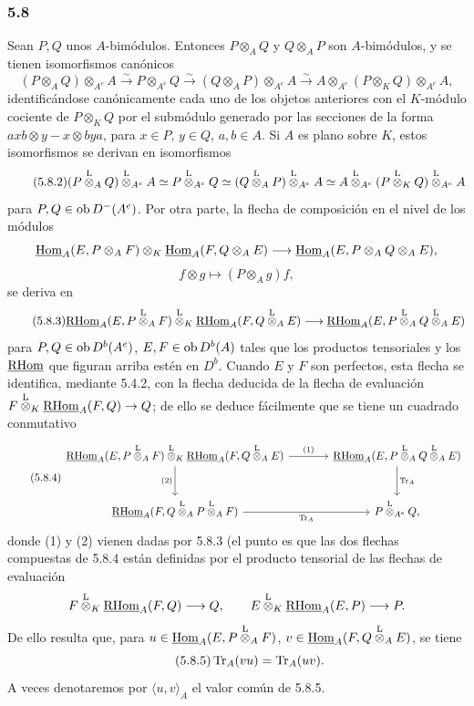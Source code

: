 \subsubsection*{5.8}

Sean $P,Q$ unos $A$-bimódulos. Entonces $P\otimes_AQ$ y $Q\otimes_AP$ son $A$-bimódulos, y se tienen isomorfismos canónicos
\begin{equation}\tag{5.8.1}
(P\otimes_AQ)\otimes_{A^e}A\xrightarrow{\sim}P\otimes_{A^e}Q\xrightarrow{\sim}(Q\otimes_AP)\otimes_{A^e}A\xrightarrow{\sim}A\otimes_{A^e}(P\otimes_KQ)\otimes_{A^e}A,
\end{equation}
identificándose canónicamente cada uno de los objetos anteriores con el $K$-módulo cociente de $P\otimes_KQ$ por el submódulo generado por las secciones de la forma $axb\otimes y-x\otimes bya$, para $x\in P$, $y\in Q$, $a,b\in A$. Si $A$ es plano sobre $K$, estos isomorfismos se derivan en isomorfismos
\begin{equation}\tag{5.8.2}
(P\overset{\mathrm L}{\otimes}_AQ)\overset{\mathrm L}{\otimes}_{A^e}A\simeq P\overset{\mathrm L}{\otimes}_{A^e}Q\simeq(Q\overset{\mathrm L}{\otimes}_AP)\overset{\mathrm L}{\otimes}_{A^e}A\simeq A\overset{\mathrm L}{\otimes}_{A^e}(P\overset{\mathrm L}{\otimes}_KQ)\overset{\mathrm L}{\otimes}_{A^e}A
\end{equation}
para $P,Q\in\operatorname{ob} D^-(A^e)$. Por otra parte, la flecha de composición en el nivel de los módulos
\[
\underline{\operatorname{Hom}}_A(E,P\otimes_AF)\otimes_K\underline{\operatorname{Hom}}_A(F,Q\otimes_AE)
\longrightarrow\underline{\operatorname{Hom}}_A(E,P\otimes_AQ\otimes_AE),
\]
\[
f\otimes g\longmapsto (P\otimes_Ag)f,
\]
se deriva en
\begin{equation}\tag{5.8.3}
\underline{\mathrm{RHom}}_A(E,P\overset{\mathrm L}{\otimes}_AF)\overset{\mathrm L}{\otimes}_K\underline{\mathrm{RHom}}_A(F,Q\overset{\mathrm L}{\otimes}_AE)
\longrightarrow\underline{\mathrm{RHom}}_A(E,P\overset{\mathrm L}{\otimes}_AQ\overset{\mathrm L}{\otimes}_AE)
\end{equation}
para $P,Q\in\operatorname{ob} D^b(A^e)$, $E,F\in\operatorname{ob} D^b(A)$ tales que los productos tensoriales y los $\underline{\mathrm{RHom}}$ que figuran arriba estén en $D^b$. Cuando $E$ y $F$ son perfectos, esta flecha se identifica, mediante 5.4.2, con la flecha deducida de la flecha de evaluación $F\overset{\mathrm L}{\otimes}_K\underline{\mathrm{RHom}}_A(F,Q)\to Q$; de ello se deduce fácilmente que se tiene un cuadrado conmutativo
\begin{equation}\tag{5.8.4}
\begin{tikzcd}[column sep=large,row sep=large]
\uRHom_A(E,P\lten_AF)\lten_K\uRHom_A(F,Q\lten_AE) \arrow[r,"(1)"] \arrow[d,"(2)"'] & \uRHom_A(E,P\lten_AQ\lten_AE) \arrow[d,"\Tr_A"]\\
\uRHom_A(F,Q\lten_AP\lten_AF) \arrow[r,"\Tr_A"'] & P\lten_{A^e}Q,
\end{tikzcd}
\end{equation}
donde (1) y (2) vienen dadas por 5.8.3 (el punto es que las dos flechas compuestas de 5.8.4 están definidas por el producto tensorial de las flechas de evaluación
\[
F\overset{\mathrm L}{\otimes}_K\underline{\mathrm{RHom}}_A(F,Q)\longrightarrow Q,\qquad
E\overset{\mathrm L}{\otimes}_K\underline{\mathrm{RHom}}_A(E,P)\longrightarrow P.
\]
De ello resulta que, para $u\in\underline{\operatorname{Hom}}_A(E,P\overset{\mathrm L}{\otimes}_AF)$, $v\in\underline{\operatorname{Hom}}_A(F,Q\overset{\mathrm L}{\otimes}_AE)$, se tiene
\begin{equation}\tag{5.8.5}
\operatorname{Tr}_A(vu)=\operatorname{Tr}_A(uv).
\end{equation}
A veces denotaremos por $\langle u,v\rangle_A$ el valor común de 5.8.5.
